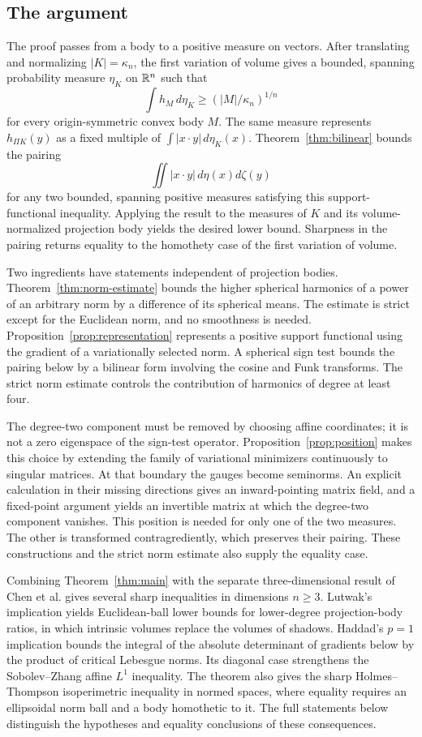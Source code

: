\subsection*{The argument}

The proof passes from a body to a positive measure on vectors.
After translating and normalizing $|K|=\kappa_n$, the first variation
of volume gives a bounded, spanning probability measure $\eta_K$ on
$\mathbb R^n$ such that
\[
 \int h_M\,d\eta_K\ge (|M|/\kappa_n)^{1/n}
\]
for every origin-symmetric convex body $M$.
The same measure represents $h_{\Pi K}(y)$ as a fixed multiple of
$\int|x\cdot y|\,d\eta_K(x)$.
Theorem~\ref{thm:bilinear} bounds the pairing
\[
 \iint|x\cdot y|\,d\eta(x)d\zeta(y)
\]
for any two bounded, spanning positive measures satisfying this
support-functional inequality. Applying the result to the measures
of $K$ and its volume-normalized projection body yields the desired
lower bound. Sharpness in the pairing returns equality to the
homothety case of the first variation of volume.

Two ingredients have statements independent of projection bodies.
Theorem~\ref{thm:norm-estimate} bounds the higher spherical harmonics
of a power of an arbitrary norm by a difference of its spherical
means. The estimate is strict except for the Euclidean norm, and no
smoothness is needed. Proposition~\ref{prop:representation} represents
a positive support functional using the gradient of a variationally
selected norm. A spherical sign test bounds the pairing below by a
bilinear form involving the cosine and Funk transforms. The strict norm estimate
controls the contribution of harmonics of degree at least four.

The degree-two component must be removed by choosing affine
coordinates; it is not a zero eigenspace of the sign-test operator.
Proposition~\ref{prop:position} makes this choice by extending the
family of variational minimizers continuously to singular matrices.
At that boundary the gauges become seminorms. An explicit calculation
in their missing directions gives an inward-pointing matrix field,
and a fixed-point argument yields an invertible matrix at which the
degree-two component vanishes. This position is needed for only one
of the two measures. The other is transformed contragrediently, which
preserves their pairing. These constructions and the strict norm
estimate also supply the equality case.

Combining Theorem~\ref{thm:main} with the separate three-dimensional
result of Chen et al. gives several sharp inequalities in dimensions
$n\ge3$. Lutwak's implication yields Euclidean-ball lower bounds for
lower-degree projection-body ratios, in which intrinsic volumes replace
the volumes of shadows. Haddad's $p=1$ implication bounds the integral of
the absolute determinant of gradients below by the product of critical
Lebesgue norms. Its
diagonal case strengthens
the Sobolev--Zhang affine $L^1$ inequality. The theorem also gives the
sharp Holmes--Thompson isoperimetric inequality in normed spaces, where
equality requires an ellipsoidal norm ball and a body homothetic to it.
The full statements below distinguish the hypotheses and equality
conclusions of these consequences.

